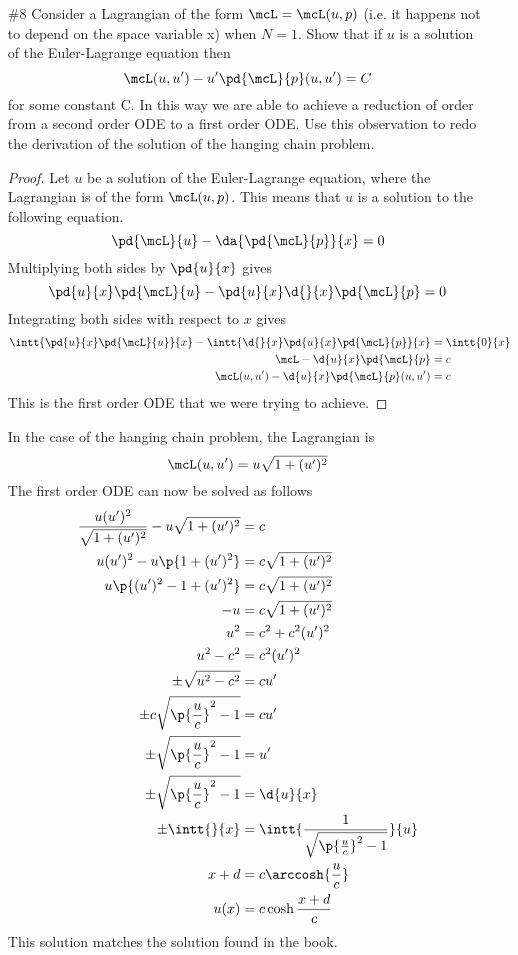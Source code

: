 \documentclass[11pt, oneside]{article}
\begin{document}
\begin{enumerate}
  \pagebreak
  \item[\#8] %
    Consider a Lagrangian of the form $\mcL = \mcL(u, p)$ (i.e. it happens not
    to depend on the space variable x) when $N = 1$.
    Show that if $u$ is a solution of the Euler-Lagrange equation then
    \[
      \mcL(u, u') - u' \pd{\mcL}{p}(u, u') = C
    \]
    for some constant C.
    In this way we are able to achieve a reduction of order from a second order
    ODE to a first order ODE.
    Use this observation to redo the derivation of the solution of the hanging
    chain problem.

    \begin{proof}
      Let $u$ be a solution of the Euler-Lagrange equation, where the Lagrangian
      is of the form $\mcL(u, p)$.
      This means that $u$ is a solution to the following equation.
      \[
        \pd{\mcL}{u} - \da{\pd{\mcL}{p}}{x} = 0
      \]
      Multiplying both sides by $\pd{u}{x}$ gives
      \[
        \pd{u}{x} \pd{\mcL}{u} - \pd{u}{x} \d{}{x} \pd{\mcL}{p} = 0
      \]
      Integrating both sides with respect to $x$ gives
      \begin{align*}
        \intt{\pd{u}{x} \pd{\mcL}{u}}{x} - \intt{\d{}{x}\pd{u}{x}  \pd{\mcL}{p}}{x} &= \intt{0}{x} \\
        \mcL - \d{u}{x}  \pd{\mcL}{p} &= c \\
        \mcL(u, u') - \d{u}{x}  \pd{\mcL}{p}(u, u') &= c \\
      \end{align*}
      This is the first order ODE that we were trying to achieve.
    \end{proof}

    In the case of the hanging chain problem, the Lagrangian is
    \[
      \mcL(u, u') = u\sqrt{1 + (u')^2}
    \]
    The first order ODE can now be solved as follows
    \begin{align*}
      \frac{u(u')^2}{\sqrt{1 + (u')^2}} - u\sqrt{1 + (u')^2} &= c \\
      u(u')^2 - u\p{1 + (u')^2} &= c\sqrt{1 + (u')^2} \\
      u\p{(u')^2 - 1 + (u')^2} &= c\sqrt{1 + (u')^2} \\
      -u &= c\sqrt{1 + (u')^2} \\
      u^2 &= c^2 + c^2(u')^2 \\
      u^2 - c^2 &= c^2(u')^2 \\
      \pm \sqrt{u^2 - c^2} &= cu' \\
      \pm c\sqrt{\p{\frac{u}{c}}^2 - 1} &= cu' \\
      \pm \sqrt{\p{\frac{u}{c}}^2 - 1} &= u' \\
      \pm \sqrt{\p{\frac{u}{c}}^2 - 1} &= \d{u}{x} \\
      \pm \intt{}{x} &= \intt{\frac{1}{\sqrt{\p{\frac{u}{c}}^2 - 1}}}{u} \\
      x + d &= c \arccosh{\frac{u}{c}} \\
      u(x) &= c \cosh{\frac{x + d}{c}}
    \end{align*}
    This solution matches the solution found in the book.


\end{enumerate}
\end{document}
